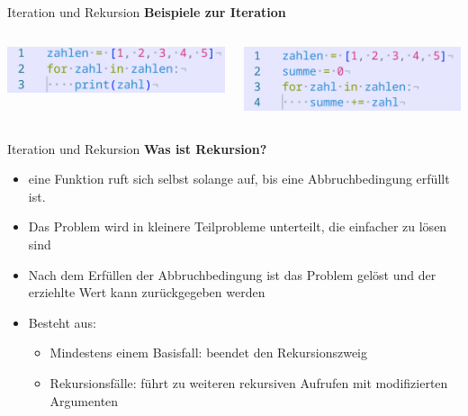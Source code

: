\documentclass[aspectratio=169]{beamer}
\begin{document}
\begin{frame}{Iteration und Rekursion}
    \textbf{Beispiele zur Iteration}
    \vspace{1cm}
    \begin{columns}
        \begin{column}{0.5\textwidth}
            \begin{tcolorbox}[colframe=oxfordblue, colback=blue!10, coltitle=white, title=Python]
                \includegraphics[width=\textwidth]{images/code_iterationexamplesimple.png}
            \end{tcolorbox}
        \end{column}
        \pause
        \begin{column}{0.5\textwidth}
            \begin{tcolorbox}[colframe=oxfordblue, colback=blue!10, coltitle=white, title=Python]
                \includegraphics[width=\textwidth]{images/code_iterationsumnumbers.png}
            \end{tcolorbox}
        \end{column}
    \end{columns}
    \vspace{1cm}
\end{frame}

\begin{frame}{Iteration und Rekursion}
    \textbf{Was ist Rekursion?}
    \begin{itemize}
        \item eine Funktion ruft sich selbst solange auf, bis eine Abbruchbedingung erfüllt ist.
        \pause
        \item Das Problem wird in kleinere Teilprobleme unterteilt, die einfacher zu lösen sind
        \pause
        \item Nach dem Erfüllen der Abbruchbedingung ist das Problem gelöst und der erziehlte Wert kann zurückgegeben werden
        \pause
        \item Besteht aus:
        \begin{itemize}
            \item Mindestens einem Basisfall: beendet den Rekursionszweig
            \item Rekursionsfälle: führt zu weiteren rekursiven Aufrufen mit modifizierten Argumenten
        \end{itemize}
    \end{itemize}
\end{frame}
\end{document}
